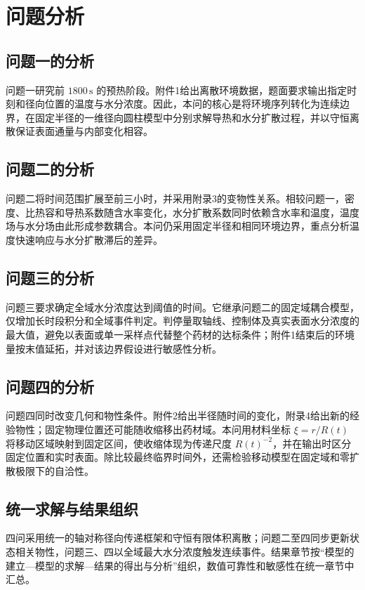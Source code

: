 \section{问题分析}

\subsection{问题一的分析}
问题一研究前 $1800\,\mathrm{s}$ 的预热阶段。附件1给出离散环境数据，题面要求输出指定时刻和径向位置的温度与水分浓度。因此，本问的核心是将环境序列转化为连续边界，在固定半径的一维径向圆柱模型中分别求解导热和水分扩散过程，并以守恒离散保证表面通量与内部变化相容。

\subsection{问题二的分析}
问题二将时间范围扩展至前三小时，并采用附录3的变物性关系。相较问题一，密度、比热容和导热系数随含水率变化，水分扩散系数同时依赖含水率和温度，温度场与水分场由此形成参数耦合。本问仍采用固定半径和相同环境边界，重点分析温度快速响应与水分扩散滞后的差异。

\subsection{问题三的分析}
问题三要求确定全域水分浓度达到阈值的时间。它继承问题二的固定域耦合模型，仅增加长时段积分和全域事件判定。判停量取轴线、控制体及真实表面水分浓度的最大值，避免以表面或单一采样点代替整个药材的达标条件；附件1结束后的环境量按末值延拓，并对该边界假设进行敏感性分析。

\subsection{问题四的分析}
问题四同时改变几何和物性条件。附件2给出半径随时间的变化，附录4给出新的经验物性；固定物理位置还可能随收缩移出药材域。本问用材料坐标 $\xi=r/R(t)$ 将移动区域映射到固定区间，使收缩体现为传递尺度 $R(t)^{-2}$，并在输出时区分固定位置和实时表面。除比较最终临界时间外，还需检验移动模型在固定域和零扩散极限下的自洽性。

\subsection{统一求解与结果组织}
四问采用统一的轴对称径向传递框架和守恒有限体积离散；问题二至四同步更新状态相关物性，问题三、四以全域最大水分浓度触发连续事件。结果章节按“模型的建立—模型的求解—结果的得出与分析”组织，数值可靠性和敏感性在统一章节中汇总。

